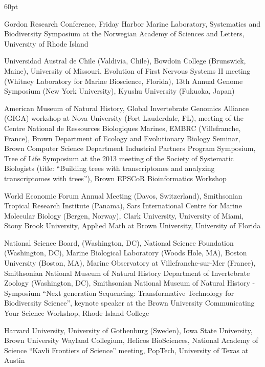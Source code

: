 \begin{entry}{60pt}
\item [\rm 2015] Gordon Research Conference, Friday Harbor Marine Laboratory, Systematics and Biodiversity Symposium at the Norwegian Academy of Sciences and Letters, University of Rhode Island

\item [\rm 2014] Universidad Austral de Chile (Valdivia, Chile), Bowdoin College (Brunswick, Maine), University of Missouri, Evolution of First Nervous Systems II meeting (Whitney Laboratory for Marine Bioscience, Florida), 13th Annual Genome Symposium (New York University), Kyushu University (Fukuoka, Japan)

\item [\rm 2013] American Museum of Natural History, Global Invertebrate Genomics Alliance (GIGA) workshop at Nova University (Fort Lauderdale, FL), meeting of the Centre National de Ressources Biologiques Marines, EMBRC (Villefranche, France), Brown Department of Ecology and Evolutionary Biology Seminar, Brown Computer Science Department Industrial Partners Program Symposium, Tree of Life Symposium at the 2013 meeting of the Society of Systematic Biologists (title: ``Building trees with transcriptomes and analyzing transcriptomes with trees''), Brown EPSCoR Bioinformatics Workshop

\item [\rm 2012] World Economic Forum Annual Meeting (Davos, Switzerland), Smithsonian Tropical Research Institute (Panama), Sars International Centre for Marine Molecular Biology (Bergen, Norway), Clark University, University of Miami, Stony Brook University, Applied Math at Brown University, University of Florida

\item [\rm 2011] National Science Board, (Washington, DC), National Science Foundation (Washington, DC), Marine Biological Laboratory (Woods Hole, MA), Boston University (Boston, MA), Marine Observatory at Villefranche-sur-Mer (France), Smithsonian National Museum of Natural History Department of Invertebrate Zoology (Washington, DC), Smithsonian National Museum of Natural History - Symposium ``Next generation Sequencing: Transformative Technology for Biodiversity Science'', keynote speaker at the Brown University Communicating Your Science Workshop, Rhode Island College

\item [\rm 2010] Harvard University, University of Gothenburg (Sweden), Iowa State University, Brown University Wayland Collegium, Helicos BioSciences, National Academy of Science ``Kavli Frontiers of Science'' meeting, PopTech, University of Texas at Austin


\end{entry}
